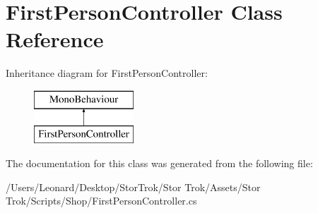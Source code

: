 \hypertarget{class_first_person_controller}{}\section{First\+Person\+Controller Class Reference}
\label{class_first_person_controller}
Inheritance diagram for First\+Person\+Controller\+:\begin{figure}[H]
\begin{center}
\leavevmode
\includegraphics[height=2.000000cm]{class_first_person_controller}
\end{center}
\end{figure}


The documentation for this class was generated from the following file\+:\begin{DoxyCompactItemize}
\item 
/\+Users/\+Leonard/\+Desktop/\+Stor\+Trok/\+Stor Trok/\+Assets/\+Stor Trok/\+Scripts/\+Shop/First\+Person\+Controller.\+cs\end{DoxyCompactItemize}
